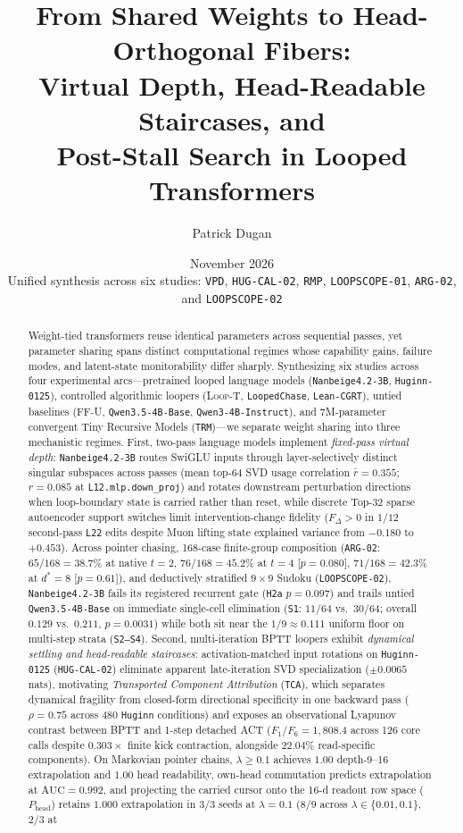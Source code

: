 \documentclass[10pt,letterpaper]{article}
\title{\bfseries From Shared Weights to Head-Orthogonal Fibers:\\[0.30em]
Virtual Depth, Head-Readable Staircases, and\\[0.14em]
Post-Stall Search in Looped Transformers}
\author{Patrick Dugan}
\date{November 2026\\[0.2em]\normalsize Unified synthesis across six studies: \texttt{VPD}, \texttt{HUG-CAL-02}, \texttt{RMP}, \texttt{LOOPSCOPE-01}, \texttt{ARG-02}, and \texttt{LOOPSCOPE-02}}
\newcommand{\LoopT}{\textsc{Loop-T}}
\newcommand{\FFU}{\textsc{FF-U}}
\newcommand{\Phead}{P_{\mathrm{head}}}
\begin{document}
\maketitle
\vspace{-0.70em}

\begin{abstract}
\noindent
Weight-tied transformers reuse identical parameters across sequential passes, yet parameter sharing spans distinct computational regimes whose capability gains, failure modes, and latent-state monitorability differ sharply. Synthesizing six studies across four experimental arcs—pretrained looped language models (\texttt{Nanbeige4.2-3B}, \texttt{Huginn-0125}), controlled algorithmic loopers (\LoopT, \texttt{LoopedChase}, \texttt{Lean-CGRT}), untied baselines (\FFU, \texttt{Qwen3.5-4B-Base}, \texttt{Qwen3-4B-Instruct}), and 7M-parameter convergent Tiny Recursive Models (\texttt{TRM})—we separate weight sharing into three mechanistic regimes. First, two-pass language models implement \emph{fixed-pass virtual depth}: \texttt{Nanbeige4.2-3B} routes SwiGLU inputs through layer-selectively distinct singular subspaces across passes (mean top-64 SVD usage correlation $\bar{r}=0.355$; $r=0.085$ at \texttt{L12.mlp.down\_proj}) and rotates downstream perturbation directions when loop-boundary state is carried rather than reset, while discrete Top-32 sparse autoencoder support switches limit intervention-change fidelity ($F_\Delta > 0$ in $1/12$ second-pass \texttt{L22} edits despite Muon lifting state explained variance from $-0.180$ to $+0.453$). Across pointer chasing, 168-case finite-group composition (\texttt{ARG-02}: $65/168 = 38.7\%$ at native $t=2$, $76/168 = 45.2\%$ at $t=4$ [$p=0.080$], $71/168 = 42.3\%$ at $d^*=8$ [$p=0.61$]), and deductively stratified $9\times 9$ Sudoku (\texttt{LOOPSCOPE-02}), \texttt{Nanbeige4.2-3B} fails its registered recurrent gate (\texttt{H2a} $p=0.097$) and trails untied \texttt{Qwen3.5-4B-Base} on immediate single-cell elimination (\texttt{S1}: $11/64$ vs.\ $30/64$; overall $0.129$ vs.\ $0.211$, $p=0.0031$) while both sit near the $1/9 \approx 0.111$ uniform floor on multi-step strata (\texttt{S2--S4}). Second, multi-iteration BPTT loopers exhibit \emph{dynamical settling and head-readable staircases}: activation-matched input rotations on \texttt{Huginn-0125} (\texttt{HUG-CAL-02}) eliminate apparent late-iteration SVD specialization ($\pm 0.0065$ nats), motivating \emph{Transported Component Attribution} (\texttt{TCA}), which separates dynamical fragility from closed-form directional specificity in one backward pass ($\rho=0.75$ across 480 \texttt{Huginn} conditions) and exposes an observational Lyapunov contrast between BPTT and 1-step detached ACT ($F_1/F_6 = 1{,}808.4$ across 126 core calls despite $0.303\times$ finite kick contraction, alongside $22.04\%$ read-specific components). On Markovian pointer chains, $\lambda \ge 0.1$ achieves $1.00$ depth-9--16 extrapolation and $1.00$ head readability, own-head commutation predicts extrapolation at $\mathrm{AUC}=0.992$, and projecting the carried cursor onto the 16-d readout row space ($\Phead$) retains $1.000$ extrapolation in $3/3$ seeds at $\lambda=0.1$ ($8/9$ across $\lambda \in \{0.01, 0.1\}$, $2/3$ at 
\end{abstract}
\end{document}
